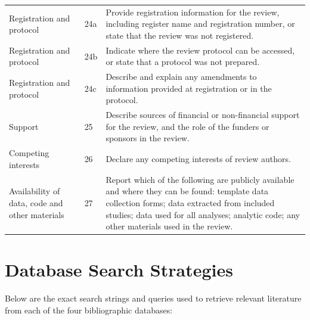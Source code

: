 \begin{longtable}{@{}p{100pt}p{35pt}p{295pt}@{}}
\midrule
Registration and protocol & 24a & Provide registration information for the review, including register name and registration number, or state that the review was not registered. \\
Registration and protocol & 24b & Indicate where the review protocol can be accessed, or state that a protocol was not prepared. \\
Registration and protocol & 24c & Describe and explain any amendments to information provided at registration or in the protocol. \\
Support & 25 & Describe sources of financial or non-financial support for the review, and the role of the funders or sponsors in the review. \\
Competing interests & 26 & Declare any competing interests of review authors. \\
Availability of data, code and other materials & 27 & Report which of the following are publicly available and where they can be found: template data collection forms; data extracted from included studies; data used for all analyses; analytic code; any other materials used in the review. \\
\bottomrule
\end{longtable}
\endgroup

\clearpage
\section{Database Search Strategies}
\label{sec:appendix_scopus}
\label{sec:appendix_search_strings}

Below are the exact search strings and queries used to retrieve relevant literature from each of the four bibliographic databases:

